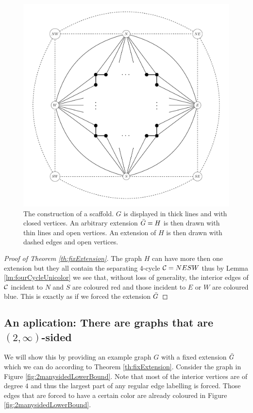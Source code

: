 \begin{figure}[h!]
\centering
\includegraphics[scale=0.5]{prelim/img/scafold}

\caption{The construction of a scaffold. $G$ is displayed in thick lines and with closed vertices. An arbitrary extension $\bar{G} =H$ is then drawn with thin lines and open vertices. An extension of $H$ is then drawn with dashed edges and open vertices.
    \label{fig:scafold}}
\end{figure}

\begin{proof}[Proof of Theorem \ref{th:fixExtension}]
  The graph $H$ can have more then one extension but they all contain the separating $4$-cycle $\mathcal{C}= NESW$ thus by Lemma \ref{lm:fourCycleUnicolor} we see that, without loss of generality, the interior edges of $\mathcal{C}$ incident to $N$ and $S$ are coloured red and those incident to $E$ or $W$ are coloured blue. This is exactly as if we forced the extension $\bar{G}$
  \end{proof}

\subsection{An aplication: There are graphs that are $(2, \infty)$-sided}

We will show this by providing an example graph $G$ with a fixed extension $\bar{G}$ which we can do according to Theorem \ref{th:fixExtension}. Consider the graph in Figure \ref{fig:2manysidedLowerBound}. Note that most of the interior vertices are of degree $4$ and thus the largest part of any regular edge labelling is forced. Those edges that are forced to have a certain color are already coloured in Figure \ref{fig:2manysidedLowerBound}.


